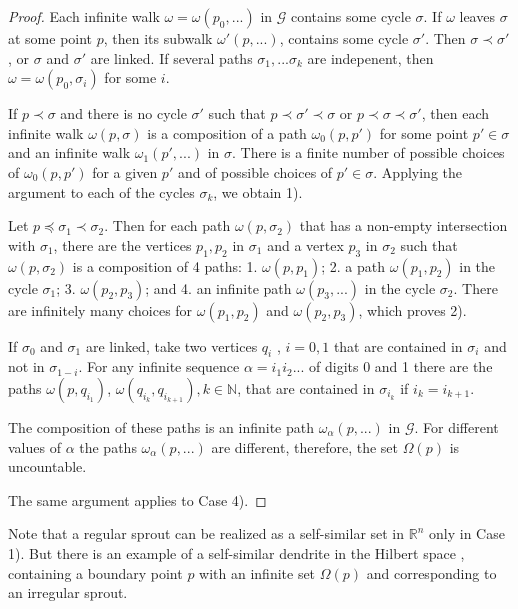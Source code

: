\documentclass[11pt,reqno]{amsart}
\begin{document}
\begin{proof} 
Each infinite walk $\omega=\omega(p_0,...)$ in ${{\mathcal G}}$ contains some cycle $\sigma$. If $\omega$ leaves $\sigma$ at some point $p$, then its subwalk $\omega'(p,...)$,  contains some cycle $\sigma'$. 
Then $\sigma\prec\sigma'$, or $\sigma$ and $\sigma'$ are linked. If several paths $\sigma_1,...\sigma_k$ are indepenent, then $\omega=\omega(p_0,\sigma_i)$ for some $i$.


If $p\prec  \sigma$ and there is no cycle $\sigma'$ such that $p\prec \sigma'\prec \sigma$ or $p\prec \sigma\prec \sigma'$, then each infinite walk $\omega(p,\sigma)$  is a composition of a path  $\omega_0(p,p')$ for some point $p'\in\sigma$ and an infinite walk $\omega_1(p',...)$    in $\sigma$. There is a finite number of possible choices of $\omega_0(p,p')$ for a given $p'$ and of  possible choices of $p'\in \sigma$. 
Applying the argument to each of the cycles $\sigma_k$, we obtain 1).



Let $p\preceq\sigma_1\prec\sigma_2$.  Then for each path $\omega(p,\sigma_2)$
 that has a non-empty intersection with $\sigma_1$, there are the vertices $p_1, p_2$ in $\sigma_1$ and a vertex $p_3$ in $\sigma_2$ such that $\omega(p,\sigma_2)$ is a composition of 4 paths: 1. $\omega(p,p_1)$;  2. a   path $\omega(p_1,p_2)$ in the cycle $\sigma_1$;  3. $\omega(p_2,p_3)$; and 4. an infinite path $\omega(p_3,...)$ in the cycle $\sigma_2$. There are infinitely many choices for $\omega(p_1,p_2)$ and $\omega(p_2,p_3)$, which proves 2).

If $\sigma_0$ and $\sigma_1$ are linked, take two vertices $q_i$ , $i=0,1$ that are contained in $\sigma_i$ and not  in $\sigma_{1-i}$.
For any infinite sequence $\alpha=i_1i_2...$ of digits 0 and 1 there are the paths $\omega(p,q_{i_1})$, $\omega(q_{i_k},q_{i_{k+1}}), k\in \mathbb{N}$, that are contained in $\sigma_{i_{k}}$ if $i_k=i_{k+1}$.

The composition of these paths is an infinite path $\omega_\alpha(p,...)$ in ${{\mathcal G}}$. For different values of $\alpha$ the paths $\omega_\alpha(p,...)$ are different, therefore, the set $\Omega(p)$ is uncountable.

The same argument applies to Case 4).
\end{proof}


Note that a regular sprout can be realized as a self-similar set in $\mathbb R^n$ only in Case 1).
But there is an example of a self-similar dendrite in the Hilbert space \cite{AK2025}, containing a boundary point $p$ with an infinite set $\Omega(p)$ and corresponding to an irregular sprout.
\end{document}
